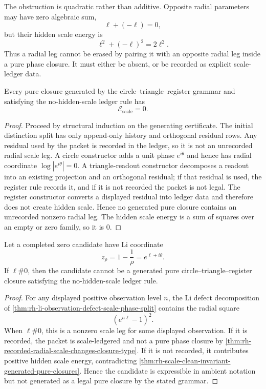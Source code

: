 \begin{principle}
\label{prin:rh-scale-energy-not-cancelled-by-mirror-signs}
The obstruction is quadratic rather than additive. Opposite radial
parameters may have zero algebraic sum,
$$
\ell+(-\ell)=0,
$$
but their hidden scale energy is
$$
\ell^2+(-\ell)^2=2\ell^2.
$$
Thus a radial leg cannot be erased by pairing it with an opposite radial
leg inside a pure phase closure. It must either be absent, or be recorded
as explicit scale-ledger data.
\end{principle}

\begin{theorem}
\label{thm:rh-scale-clean-invariant-generated-pure-closures}
Every pure closure generated by the circle--triangle--register grammar
and satisfying the no-hidden-scale ledger rule has
$$
\mathcal E_{\mathrm{scale}}=0.
$$
\end{theorem}

\begin{proof}
Proceed by structural induction on the generating certificate. The
initial distinction split has only append-only history and orthogonal
residual rows. Any residual used by the packet is recorded in the
ledger, so it is not an unrecorded radial scale leg. A circle constructor
adds a unit phase $e^{i\theta}$ and hence has radial coordinate
$\log|e^{i\theta}|=0$. A triangle-readout constructor decomposes a
readout into an existing projection and an orthogonal residual; if that
residual is used, the register rule records it, and if it is not
recorded the packet is not legal. The register constructor converts a
displayed residual into ledger data and therefore does not create hidden
scale. Hence no generated pure closure contains an unrecorded nonzero
radial leg. The hidden scale energy is a sum of squares over an empty or
zero family, so it is $0$.
\end{proof}

\begin{theorem}
\label{thm:rh-off-line-li-coordinate-not-generated-pure-closure}
Let a completed zero candidate have Li coordinate
$$
z_{\rho}=1-\frac1{\rho}=e^{\ell+i\theta}.
$$
If $\ell\#0$, then the candidate cannot be a generated pure
circle--triangle--register closure satisfying the no-hidden-scale ledger
rule.
\end{theorem}

\begin{proof}
For any displayed positive observation level $n$, the Li defect
decomposition of
\autoref{thm:rh-li-observation-defect-scale-phase-split} contains the
radial square
$$
(e^{n\ell}-1)^2.
$$
When $\ell\#0$, this is a nonzero scale leg for some displayed
observation. If it is recorded, the packet is scale-ledgered and not a
pure phase closure by
\autoref{thm:rh-recorded-radial-scale-changes-closure-type}. If it is
not recorded, it contributes positive hidden scale energy, contradicting
\autoref{thm:rh-scale-clean-invariant-generated-pure-closures}. Hence
the candidate is expressible in ambient notation but not generated as a
legal pure closure by the stated grammar.
\end{proof}

